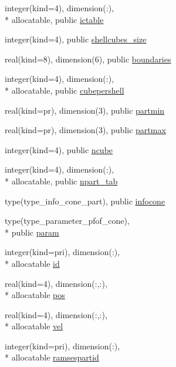 \begin{DoxyCompactItemize}
\item 
integer(kind=4), dimension(\-:), \\*
allocatable, public \hyperlink{classmodvariables_a16ace0f388a2561105bd96f1a1af77b4}{ictable}
\item 
integer(kind=4), public \hyperlink{classmodvariables_a79023913d4487b1b36fb2aa2dca94506}{shellcubes\-\_\-size}
\item 
real(kind=8), dimension(6), public \hyperlink{classmodvariables_a1befa48bffc98e4022545362ad70c3ea}{boundaries}
\item 
integer(kind=4), dimension(\-:), \\*
allocatable, public \hyperlink{classmodvariables_ab4fedc63b2d055a809f7d9d90dabf305}{cubepershell}
\item 
real(kind=pr), dimension(3), public \hyperlink{classmodvariables_a103c50d97008cd05f4781b820a51e4cb}{partmin}
\item 
real(kind=pr), dimension(3), public \hyperlink{classmodvariables_aa4d6e284cd4d33fbf81f05c0f7604fd0}{partmax}
\item 
integer(kind=4), public \hyperlink{classmodvariables_af8737100fdfbf6c331be1bb7c5ab0925}{ncube}
\item 
integer(kind=4), dimension(\-:), \\*
allocatable, public \hyperlink{classmodvariables_a550c917b1362f35e62480385b6ae8863}{npart\-\_\-tab}
\item 
type(type\-\_\-info\-\_\-cone\-\_\-part), public \hyperlink{classmodvariables_a48325a5fd368cb5c42b94981c0b2fb51}{infocone}
\item 
type(type\-\_\-parameter\-\_\-pfof\-\_\-cone), \\*
public \hyperlink{classmodvariables_ae13e648c61e7efdc91f1485b2c3b3e5e}{param}
\item 
integer(kind=pri), dimension(\-:), \\*
allocatable \hyperlink{classmodvariables_ac2069a0665c46610db9e57a5d5eaf195}{id}
\item 
real(kind=4), dimension(\-:,\-:), \\*
allocatable \hyperlink{classmodvariables_a2f72d5750b0cf2e9bfa6e139d09c6862}{pos}
\item 
real(kind=4), dimension(\-:,\-:), \\*
allocatable \hyperlink{classmodvariables_a9f11e44143a4c5cd47740e58712bbe1c}{vel}
\item 
integer(kind=pri), dimension(\-:), \\*
allocatable \hyperlink{classmodvariables_aad55ee2cd6f458e86f0f8fa31339fac1}{ramsespartid}

\end{DoxyCompactItemize}
